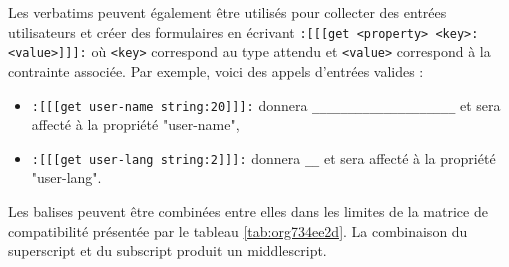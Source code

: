 \documentclass[a4paper,12pt]{article}
\begin{document}
Les verbatims peuvent également être utilisés pour collecter des entrées utilisateurs et créer des formulaires en écrivant \texttt{:[[[get <property> <key>:<value>]]]:} où \texttt{<key>} correspond au type attendu et \texttt{<value>} correspond à la contrainte associée. Par exemple, voici des appels d'entrées valides :
\begin{itemize}
\item \texttt{:[[[get user-name string:20]]]:} donnera \texttt{\_\_\_\_\_\_\_\_\_\_\_\_\_\_\_\_\_\_\_\_} et sera affecté à la propriété "user-name",
\item \texttt{:[[[get user-lang string:2]]]:} donnera \texttt{\_\_} et sera affecté à la propriété "user-lang".
\end{itemize}

Les balises peuvent être combinées entre elles dans les limites de la matrice de compatibilité présentée par le tableau \ref{tab:org734ee2d}. La combinaison du superscript et du subscript produit un middlescript.
\end{document}
